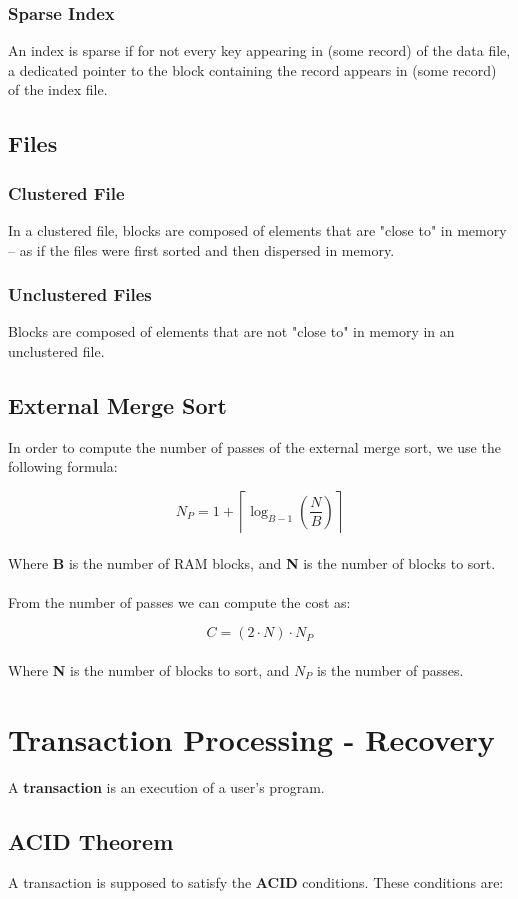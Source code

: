\documentclass{article}
\begin{document}
\subsubsection{Sparse Index}
An index is sparse if for not every key appearing in (some record) of the data file, a dedicated pointer to the block containing the record appears in (some record) of the index file.

\subsection{Files}
\subsubsection{Clustered File}
In a clustered file, blocks are composed of elements that are "close to" in memory -- as if the files were first sorted and then dispersed in memory.

\subsubsection{Unclustered Files}
Blocks are composed of elements that are not "close to" in memory in an unclustered file.

\subsection{External Merge Sort}
In order to compute the number of passes of the external merge sort, we use the following formula:

\[ N_P = 1 + \left\lceil \log_{B-1}\left(\frac{N}{B}\right) \right\rceil \] \\
Where \textbf{B} is the number of RAM blocks, and \textbf{N} is the number of blocks to sort. \\ \\
From the number of passes we can compute the cost as:

\[ C = (2 \cdot N) \cdot N_P \] \\
Where \textbf{N} is the number of blocks to sort, and $N_P$ is the number of passes.

\section{Transaction Processing - Recovery}
A \textbf{transaction} is an execution of a user's program.

\subsection{ACID Theorem}
A transaction is supposed to satisfy the \textbf{ACID} conditions. These conditions are:
\end{document}
